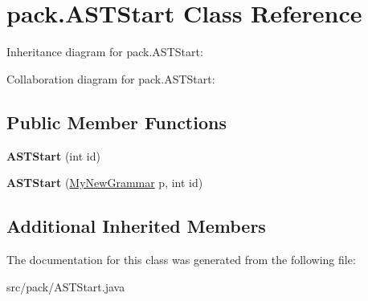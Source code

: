 \hypertarget{classpack_1_1_a_s_t_start}{}\section{pack.\+A\+S\+T\+Start Class Reference}
\label{classpack_1_1_a_s_t_start}


Inheritance diagram for pack.\+A\+S\+T\+Start\+:


Collaboration diagram for pack.\+A\+S\+T\+Start\+:
\subsection*{Public Member Functions}
\begin{DoxyCompactItemize}
\item 
{\bfseries A\+S\+T\+Start} (int id)\hypertarget{classpack_1_1_a_s_t_start_a83f41fe534ffea4bdfcaba92bef8b238}{}\label{classpack_1_1_a_s_t_start_a83f41fe534ffea4bdfcaba92bef8b238}

\item 
{\bfseries A\+S\+T\+Start} (\hyperlink{classpack_1_1_my_new_grammar}{My\+New\+Grammar} p, int id)\hypertarget{classpack_1_1_a_s_t_start_ab2aa688ab79176ba5c37c54c060b7fd7}{}\label{classpack_1_1_a_s_t_start_ab2aa688ab79176ba5c37c54c060b7fd7}

\end{DoxyCompactItemize}
\subsection*{Additional Inherited Members}


The documentation for this class was generated from the following file\+:\begin{DoxyCompactItemize}
\item 
src/pack/A\+S\+T\+Start.\+java\end{DoxyCompactItemize}
